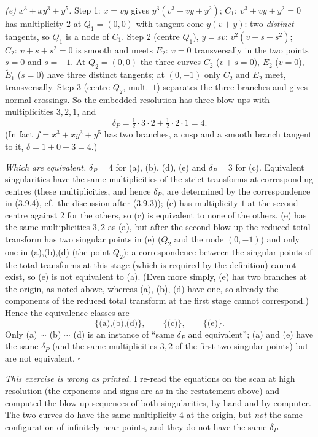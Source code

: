 \documentclass[11pt]{article}
\begin{document}
\emph{(e) $x^3+xy^3+y^5$.} Step 1: $x=vy$ gives $y^3(v^3+vy+y^2)$; $C_1:\ v^3+vy+y^2=0$ has multiplicity $2$ at $Q_1=(0,0)$ with tangent cone $y(v+y)$: two \emph{distinct} tangents, so $Q_1$ is a node of $C_1$. Step 2 (centre $Q_1$), $y=sv$: $v^2(v+s+s^2)$; $C_2:\ v+s+s^2=0$ is smooth and meets $E_2:\ v=0$ transversally in the two points $s=0$ and $s=-1$. At $Q_2=(0,0)$ the three curves $C_2$ ($v+s=0$), $E_2$ ($v=0$), $\widetilde E_1$ ($s=0$) have three distinct tangents; at $(0,-1)$ only $C_2$ and $E_2$ meet, transversally. Step 3 (centre $Q_2$, mult.\ $1$) separates the three branches and gives normal crossings. So the embedded resolution has three blow-ups with multiplicities $3,2,1$, and
\[
\delta_P=\tfrac12\cdot3\cdot2+\tfrac12\cdot2\cdot1=4 .
\]
(In fact $f=x^3+xy^3+y^5$ has two branches, a cusp and a smooth branch tangent to it, $\delta=1+0+3=4$.)

\emph{Which are equivalent.} $\delta_P=4$ for (a), (b), (d), (e) and $\delta_P=3$ for (c). Equivalent singularities have the same multiplicities of the strict transforms at corresponding centres (these multiplicities, and hence $\delta_P$, are determined by the correspondence in (3.9.4), cf.\ the discussion after (3.9.3)); (c) has multiplicity $1$ at the second centre against $2$ for the others, so (c) is equivalent to none of the others. (e) has the same multiplicities $3,2$ as (a), but after the second blow-up the reduced total transform has two singular points in (e) ($Q_2$ and the node $(0,-1)$) and only one in (a),(b),(d) (the point $Q_2$); a correspondence between the singular points of the total transforms at this stage (which is required by the definition) cannot exist, so (e) is not equivalent to (a). (Even more simply, (e) has two branches at the origin, as noted above, whereas (a), (b), (d) have one, so already the components of the reduced total transform at the first stage cannot correspond.) Hence the equivalence classes are
\[
\{\text{(a),(b),(d)}\},\qquad\{\text{(c)}\},\qquad\{\text{(e)}\}.
\]
Only (a) $\sim$ (b) $\sim$ (d) is an instance of ``same $\delta_P$ and equivalent''; (a) and (e) have the same $\delta_P$ (and the same multiplicities $3,2$ of the first two singular points) but are not equivalent. \hfill$\square$

\pf
\emph{This exercise is wrong as printed.} I re-read the equations on the scan at high resolution (the exponents and signs are as in the restatement above) and computed the blow-up sequences of both singularities, by hand and by computer. The two curves do have the same multiplicity $4$ at the origin, but \emph{not} the same configuration of infinitely near points, and they do not have the same $\delta_P$.
\end{document}
